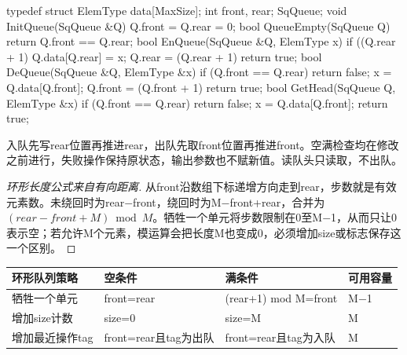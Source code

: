 \par\medskip\noindent\begin{minipage}{\linewidth}
\begin{codeblock}[language=C++]
typedef struct {
    ElemType data[MaxSize];
    int front, rear;
} SqQueue;
void InitQueue(SqQueue &Q) { Q.front = Q.rear = 0; }
bool QueueEmpty(SqQueue Q) { return Q.front == Q.rear; }
bool EnQueue(SqQueue &Q, ElemType x) {
    if ((Q.rear + 1) %
    Q.data[Q.rear] = x;
    Q.rear = (Q.rear + 1) %
    return true;
}
bool DeQueue(SqQueue &Q, ElemType &x) {
    if (Q.front == Q.rear) return false;
    x = Q.data[Q.front];
    Q.front = (Q.front + 1) %
    return true;
}
bool GetHead(SqQueue Q, ElemType &x) {
    if (Q.front == Q.rear) return false;
    x = Q.data[Q.front];
    return true;
}
\end{codeblock}
\end{minipage}\par\medskip

入队先写rear位置再推进rear，出队先取front位置再推进front。空满检查均在修改之前进行，失败操作保持原状态，输出参数也不赋新值。读队头只读取，不出队。

\begin{proof}[环形长度公式来自有向距离]

从front沿数组下标递增方向走到rear，步数就是有效元素数。未绕回时为rear\ensuremath{-}front，绕回时为M\ensuremath{-}front+rear，合并为\((rear-front+M)\bmod M\)。牺牲一个单元将步数限制在0至M\ensuremath{-}1，从而只让0表示空；若允许M个元素，模运算会把长度M也变成0，必须增加size或标志保存这一个区别。

\end{proof}

\begin{wideblock}

\par\medskip\noindent\begin{minipage}{\linewidth}\fontsize{9.3}{12}\selectfont\begin{tabularx}{\linewidth}{@{}YYYY@{}}
\toprule\noalign{}
环形队列策略 & 空条件 & 满条件 & 可用容量 \\
\midrule\noalign{}


牺牲一个单元 & front=rear & (rear+1) mod M=front & M\ensuremath{-}1 \\
增加size计数 & size=0 & size=M & M \\
增加最近操作tag & front=rear且tag为出队 & front=rear且tag为入队 & M \\
\bottomrule\end{tabularx}
\end{minipage}\par\medskip

\end{wideblock}

